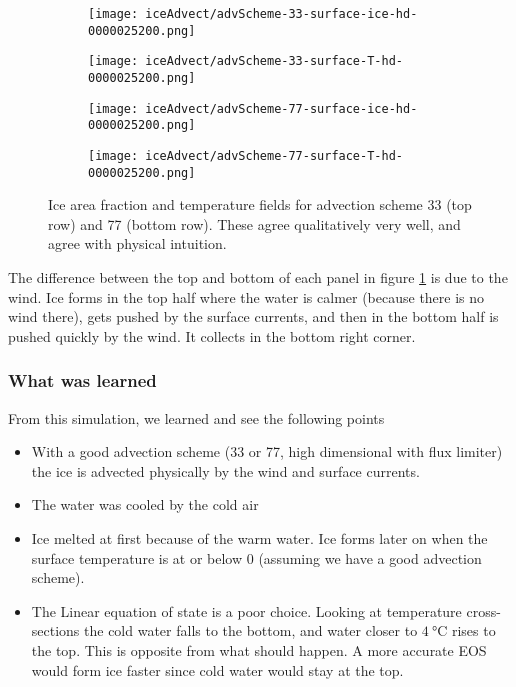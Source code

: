 \documentclass[11pt]{article}
\begin{document}
\begin{figure}[h!]
\centering
\begin{subfigure}{0.45\linewidth}
	\texttt{[image: iceAdvect/advScheme-33-surface-ice-hd-0000025200.png]}
\end{subfigure}
\begin{subfigure}{0.45\linewidth}
\texttt{[image: iceAdvect/advScheme-33-surface-T-hd-0000025200.png]}
\end{subfigure}

\begin{subfigure}{0.45\linewidth}
\texttt{[image: iceAdvect/advScheme-77-surface-ice-hd-0000025200.png]}
\end{subfigure}
\begin{subfigure}{0.45\linewidth}
\texttt{[image: iceAdvect/advScheme-77-surface-T-hd-0000025200.png]}
\end{subfigure}

\caption{Ice area fraction and temperature fields for advection scheme 33 (top row) and 77 (bottom row). These agree qualitatively very well, and agree with physical intuition. }
\label{fig:advSchemes}
\end{figure}
The difference between the top and bottom of each panel in figure \ref{fig:advSchemes} is due to the wind. Ice forms in the top half where the water is calmer (because there is no wind there), gets pushed by the surface currents, and then in the bottom half is pushed quickly by the wind. It collects in the bottom right corner.


\subsubsection{What was learned}
From this simulation, we learned and see the following points
\begin{itemize}
\item{With a good advection scheme (33 or 77, high dimensional with flux limiter) the ice is advected physically by the wind and surface currents.}
\item{The water was cooled by the cold air}
\item{Ice melted at first because of the warm water. Ice forms later on when the surface temperature is at or below 0 (assuming we have a good advection scheme).}
\item{The Linear equation of state is a poor choice. Looking at temperature cross-sections the cold water falls to the bottom, and water closer to $\SI{4}{\celsius}$ rises to the top. This is opposite from what should happen. A more accurate EOS would form ice faster since cold water would stay at the top.}
\end{itemize}
\end{document}
